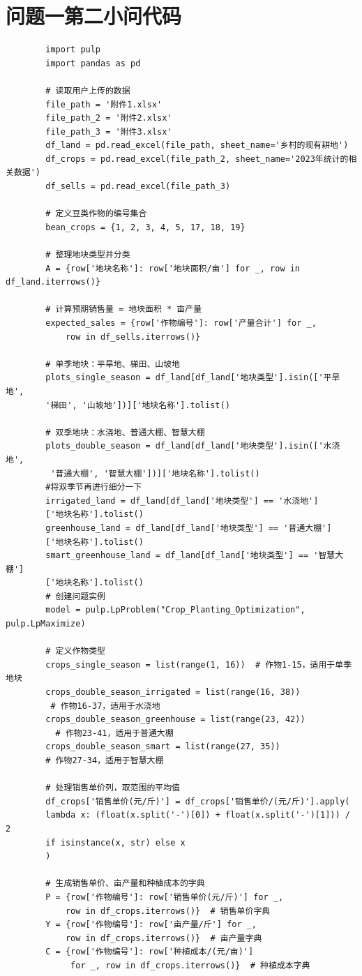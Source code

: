 \documentclass[12pt]{ctexart}
\begin{document}
	
	\section{问题一第二小问代码}  
	\noindent 
	\begin{verbatim}
		import pulp
		import pandas as pd
		
		# 读取用户上传的数据
		file_path = '附件1.xlsx'
		file_path_2 = '附件2.xlsx'
		file_path_3 = '附件3.xlsx'
		df_land = pd.read_excel(file_path, sheet_name='乡村的现有耕地')
		df_crops = pd.read_excel(file_path_2, sheet_name='2023年统计的相关数据')
		df_sells = pd.read_excel(file_path_3)
		
		# 定义豆类作物的编号集合
		bean_crops = {1, 2, 3, 4, 5, 17, 18, 19}
		
		# 整理地块类型并分类
		A = {row['地块名称']: row['地块面积/亩'] for _, row in df_land.iterrows()}
		
		# 计算预期销售量 = 地块面积 * 亩产量
		expected_sales = {row['作物编号']: row['产量合计'] for _, 
			row in df_sells.iterrows()}
		
		# 单季地块：平旱地、梯田、山坡地
		plots_single_season = df_land[df_land['地块类型'].isin(['平旱地', 
		'梯田', '山坡地'])]['地块名称'].tolist()
		
		# 双季地块：水浇地、普通大棚、智慧大棚
		plots_double_season = df_land[df_land['地块类型'].isin(['水浇地',
		 '普通大棚', '智慧大棚'])]['地块名称'].tolist()
		#将双季节再进行细分一下
		irrigated_land = df_land[df_land['地块类型'] == '水浇地']
		['地块名称'].tolist()
		greenhouse_land = df_land[df_land['地块类型'] == '普通大棚']
		['地块名称'].tolist()
		smart_greenhouse_land = df_land[df_land['地块类型'] == '智慧大棚']
		['地块名称'].tolist()
		# 创建问题实例
		model = pulp.LpProblem("Crop_Planting_Optimization", pulp.LpMaximize)
		
		# 定义作物类型
		crops_single_season = list(range(1, 16))  # 作物1-15，适用于单季地块
		crops_double_season_irrigated = list(range(16, 38)) 
		 # 作物16-37，适用于水浇地
		crops_double_season_greenhouse = list(range(23, 42))
		  # 作物23-41，适用于普通大棚
		crops_double_season_smart = list(range(27, 35))  
		# 作物27-34，适用于智慧大棚
		
		# 处理销售单价列，取范围的平均值
		df_crops['销售单价(元/斤)'] = df_crops['销售单价/(元/斤)'].apply(
		lambda x: (float(x.split('-')[0]) + float(x.split('-')[1])) / 2 
		if isinstance(x, str) else x
		)
		
		# 生成销售单价、亩产量和种植成本的字典
		P = {row['作物编号']: row['销售单价(元/斤)'] for _, 
			row in df_crops.iterrows()}  # 销售单价字典
		Y = {row['作物编号']: row['亩产量/斤'] for _, 
			row in df_crops.iterrows()}  # 亩产量字典
		C = {row['作物编号']: row['种植成本/(元/亩)']
			 for _, row in df_crops.iterrows()}  # 种植成本字典
		

\end{verbatim}
\end{document}
